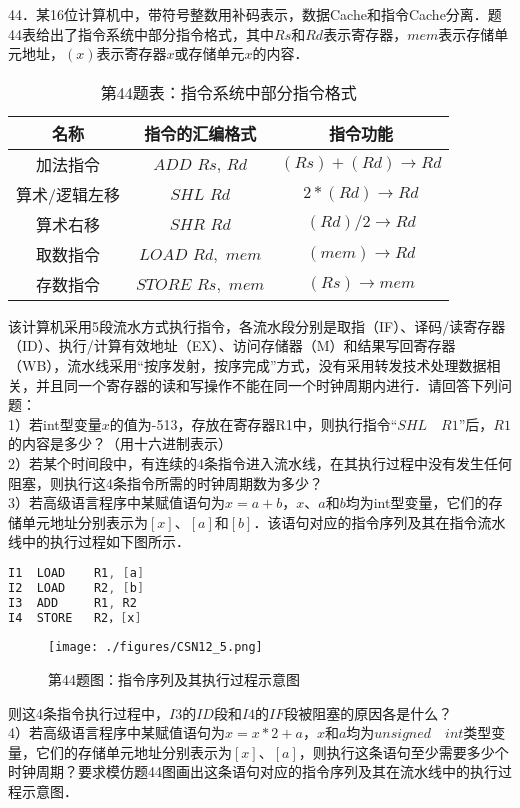 44．某16位计算机中，带符号整数用补码表示，数据Cache和指令Cache分离．题44表给出了指令系统中部分指令格式，其中$Rs$和$Rd$表示寄存器，$mem$表示存储单元地址，$(x)$表示寄存器$x$或存储单元$x$的内容．\\
\begin{table}[ht]
\centering
\caption{第44题表：指令系统中部分指令格式}\label{CSN12_tab2}
\begin{tabular}{|c|c|c|}
\hline
名称 & 指令的汇编格式 & 指令功能 \\
\hline
加法指令 & $ADD$ $Rs$, $Rd$ & $(Rs)+(Rd) \rightarrow Rd$ \\
\hline
算术/逻辑左移 & $SHL$ $Rd$ & $2*(Rd) \rightarrow Rd$ \\
\hline
算术右移 & $SHR$ $Rd$ & $(Rd)/2 \rightarrow Rd$ \\
\hline
取数指令& $LOAD$ $Rd,$ $mem$ & $(mem) \rightarrow Rd$ \\
\hline
存数指令 & $STORE$ $Rs,$ $mem$ & $(Rs) \rightarrow mem$ \\
\hline
\end{tabular}
\end{table}
该计算机采用5段流水方式执行指令，各流水段分别是取指（IF）、译码/读寄存器（ID）、执行/计算有效地址（EX）、访问存储器（M）和结果写回寄存器（WB），流水线采用“按序发射，按序完成”方式，没有采用转发技术处理数据相关，并且同一个寄存器的读和写操作不能在同一个时钟周期内进行．请回答下列问题：\\
1）若int型变量$x$的值为-513，存放在寄存器R1中，则执行指令“$SHL \quad R1$”后，$R1$的内容是多少？（用十六进制表示）\\
2）若某个时间段中，有连续的4条指令进入流水线，在其执行过程中没有发生任何阻塞，则执行这4条指令所需的时钟周期数为多少？\\
3）若高级语言程序中某赋值语句为$x=a+b$，$x$、$a$和$b$均为int型变量，它们的存储单元地址分别表示为$[x]$、$[a]$和$[b]$．该语句对应的指令序列及其在指令流水线中的执行过程如下图所示．\\
\begin{lstlisting}[language=cpp]
I1  LOAD    R1, [a]
I2  LOAD    R2, [b]
I3  ADD     R1, R2
I4  STORE   R2，[x]
\end{lstlisting}
\begin{figure}[ht]
\centering
\texttt{[image: ./figures/CSN12\_5.png]}
\caption{第44题图：指令序列及其执行过程示意图} \label{CSN12_fig5}
\end{figure}
则这4条指令执行过程中，$I3$的$ID$段和$I4$的$IF$段被阻塞的原因各是什么？\\
4）若高级语言程序中某赋值语句为$x=x*2+a$，$x$和$a$均为$unsigned \quad int$类型变量，它们的存储单元地址分别表示为$[x]$、$[a]$，则执行这条语句至少需要多少个时钟周期？要求模仿题44图画出这条语句对应的指令序列及其在流水线中的执行过程示意图．

